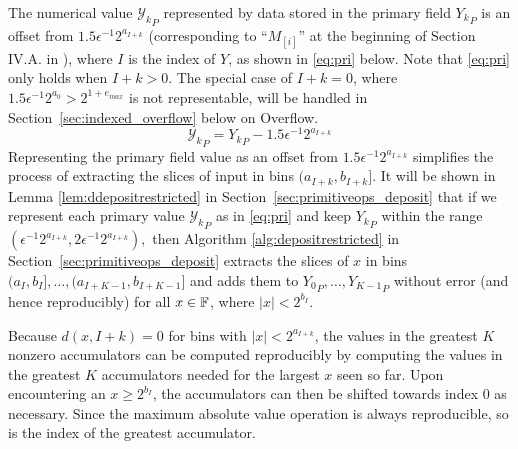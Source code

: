       The numerical value ${\mathcal{Y}_k}_P$ represented by data stored in the
      primary field ${Y_k}_P$ is an offset from $1.5\epsilon^{-1}2^{a_{I + k}}$
      (corresponding to ``$M_{[i]}$'' at the beginning of Section IV.A. in
      \cite{repsum}), where $I$ is the index of $Y$, as shown in
      \eqref{eq:pri} below.
      Note that \eqref{eq:pri} only holds when $I+k > 0$. The special case of $I+k=0$,
      where $1.5\epsilon^{-1}2^{a_0} > 2^{1+e_{max}}$ is not representable,
      will be handled in Section~\ref{sec:indexed_overflow} below on Overflow.
      \begin{equation}
        {\mathcal{Y}_k}_P = {Y_k}_P - 1.5\epsilon^{-1}2^{a_{I + k}}
        \label{eq:pri}
      \end{equation}
      Representing the primary field value as an offset from $1.5\epsilon^{-1}2^{a_{I + k}}$ simplifies the process of extracting the slices of input in bins
      $(a_{I + k}, b_{I + k}]$. It will be shown in Lemma
      \ref{lem:ddepositrestricted} in Section~\ref{sec:primitiveops_deposit}
      that if we represent each primary value ${\mathcal{Y}_k}_P$ as in
      \eqref{eq:pri} and keep ${Y_k}_P$ within the range
      \(
      	(\epsilon^{-1} 2^{a_{I + k}}, 2 \epsilon^{-1} 2^{a_{I + k}}),
      \)
      then Algorithm
      \ref{alg:depositrestricted} in Section~\ref{sec:primitiveops_deposit}
      extracts the slices of $x$ in bins 
      \(
      	(a_I, b_I], \ldots, (a_{I + K - 1}, b_{I + K - 1}]
      \)
      and adds them to ${Y_0}_P, \ldots, {Y_{K - 1}}_P$ without error
      (and hence reproducibly) for all $x \in \mathbb{F}$, where $|x| < 2^{b_I}$.

      Because $d(x, I + k) = 0$ for bins with $|x| < 2^{a_{I + k}}$, the values
      in the greatest $K$ nonzero accumulators can be computed reproducibly by
      computing the values in the greatest $K$ accumulators needed for the
      largest $x$ seen so far. Upon encountering an $x \geq 2^{b_I}$, the
      accumulators can then be shifted towards index $0$ as necessary.  Since
      the maximum absolute value operation is always reproducible, so is the
      index of the greatest accumulator.

